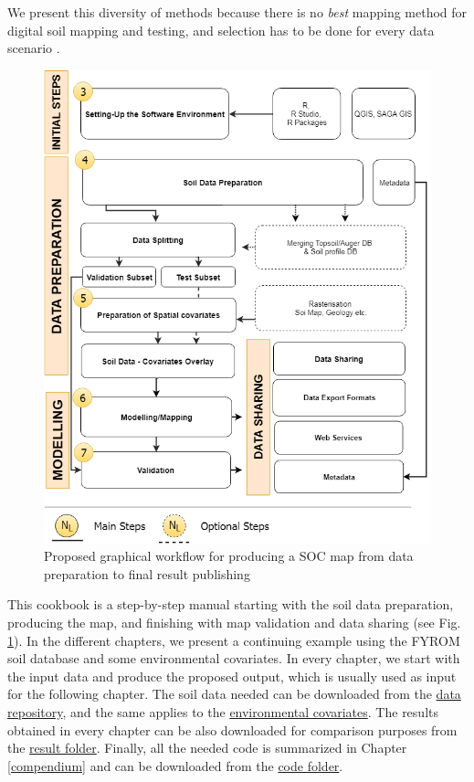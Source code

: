 \documentclass[10pt,b5paper,]{book}
\theoremstyle{definition}
\theoremstyle{definition}
\theoremstyle{definition}
\theoremstyle{remark}
\begin{document}
We present this diversity of methods because there is no \emph{best}
mapping method for digital soil mapping
 and testing, and selection has to be
done for every data scenario \citep{guevara_2018}.

\begin{figure}

{\centering \includegraphics[width=0.8\linewidth]{images/grworkflow} 

}

\caption{Proposed graphical workflow for producing a SOC map from data preparation to final result publishing}\label{fig:grworkflow}
\end{figure}

This cookbook is a step-by-step manual starting with the soil data
preparation, producing the map, and finishing with map validation and
data sharing (see Fig. \ref{fig:grworkflow}). In the different chapters,
we present a continuing example using the FYROM soil database and some
environmental covariates. In every chapter, we start with the input data
and produce the proposed output, which is usually used as input for the
following chapter. The soil data needed can be downloaded from the
\href{https://github.com/FAO-GSP/SOC-Mapping-Cookbook/tree/master/data}{data
repository}, and the same applies to the
\href{https://github.com/FAO-GSP/SOC-Mapping-Cookbook/tree/master/covs}{environmental
covariates}. The results obtained in every chapter can be also
downloaded for comparison purposes from the
\href{https://github.com/FAO-GSP/SOC-Mapping-Cookbook/tree/master/results}{result
folder}. Finally, all the needed code is summarized in Chapter
\ref{compendium} and can be downloaded from the
\href{https://github.com/FAO-GSP/SOC-Mapping-Cookbook/tree/master/code}{code
folder}.
\end{document}
